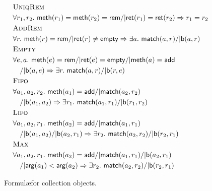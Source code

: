 \begin{figure}
  \footnotesize
  \begin{align*}
    & \textsc{UniqRem} \\
      & \forall r_1, r_2.\
        {\sf meth}(r_1) = {\sf meth}(r_2) = {\sf rem} /|
        {\sf ret}(r_1) = {\sf ret}(r_2) => r_1 = r_2
    \\
    & \textsc{AddRem} \\
    & \forall r.\ {\sf meth}(r) = {\sf rem} /| {\sf ret}(r) \neq {\sf empty} =>
      \exists a.\ {\sf match}(a,r) /| {\sf b}(a,r)
    \\
    & \textsc{Empty} \\
    & \forall e, a.\ {\sf meth}(e) = {\sf rem} /| {\sf ret}(e) = {\sf empty} /| {\sf meth}(a) = {\sf add} \\
    & \quad /| {\sf b}(a,e) => \exists r.\ {\sf match}(a,r) /| {\sf b}(r,e)
    \\
    & \textsc{Fifo} \\
    & \forall a_1, a_2, r_2.\ {\sf meth}(a_1) = {\sf add} /| {\sf match}(a_2,r_2) \\
    & \quad /| {\sf b}(a_1,a_2) =>\exists r_1.\ {\sf match}(a_1,r_1) /| {\sf b}(r_1,r_2)
    \\
    & \textsc{Lifo} \\
    & \forall a_1, a_2, r_1.\ {\sf meth}(a_2) = {\sf add} /| {\sf match}(a_1,r_1) \\
    & \quad /| {\sf b}(a_1,a_2) /| {\sf b}(a_2,r_1) => \exists r_2.\ {\sf match}(a_2,r_2) /| {\sf b}(r_2,r_1)
    \\
    & \textsc{Max} \\
    & \forall a_1, a_2, r_1.\ {\sf meth}(a_2) = {\sf add} /| {\sf match}(a_1,r_1) /| {\sf b}(a_2,r_1) \\
    & \quad /| {\sf arg}(a_1) < {\sf arg}(a_2) => \exists r_2.\ {\sf match}(a_2,r_2) /| {\sf b}(r_2,r_1)
  \end{align*}
  \caption{Formul\ae for collection objects.}
  \label{fig:formulas:collecions}
\end{figure}

%
%

